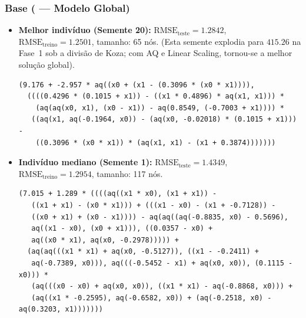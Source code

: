\subsubsection{Base  ( --- Modelo Global)}
\begin{itemize}
  \item \textbf{Melhor indivíduo (Semente 20):}
        $\text{RMSE}_{\text{teste}} = \mathbf{1.2842}$, $\text{RMSE}_{\text{treino}} = 1.2501$, tamanho: 65 nós.
        (Esta semente explodia para $415.26$ na Fase~1 sob a divisão de Koza;
        com AQ e Linear Scaling, tornou-se a melhor solução global).
\begin{lstlisting}
(9.176 + -2.957 * aq((x0 + (x1 - (0.3096 * (x0 * x1)))),
  ((((0.4296 * (0.1015 + x1)) - ((x1 * 0.4896) * aq(x1, x1))) *
    (aq(aq(x0, x1), (x0 - x1)) - aq(0.8549, (-0.7003 + x1)))) *
   ((aq(x1, aq(-0.1964, x0)) - (aq(x0, -0.02018) * (0.1015 + x1))) -
    ((0.3096 * (x0 * x1)) * (aq(x1, x1) - (x1 + 0.3874)))))))
\end{lstlisting}
  \item \textbf{Indivíduo mediano (Semente 1):}
        $\text{RMSE}_{\text{teste}} = 1.4349$, $\text{RMSE}_{\text{treino}} = 1.2954$, tamanho: 117 nós.
\begin{lstlisting}
(7.015 + 1.289 * ((((aq((x1 * x0), (x1 + x1)) -
   ((x1 + x1) - (x0 * x1))) + (((x1 - x0) - (x1 + -0.7128)) -
   ((x0 + x1) + (x0 - x1)))) - aq(aq((aq(-0.8835, x0) - 0.5696),
   aq((x1 - x0), (x0 + x1))), ((0.0357 - x0) +
   aq((x0 * x1), aq(x0, -0.2978))))) +
  (aq(aq(((x1 * x1) + aq(x0, -0.5127)), ((x1 - -0.2411) +
   aq(-0.7389, x0))), aq(((-0.5452 - x1) + aq(x0, x0)), (0.1115 - x0))) *
   (aq(((x0 - x0) + aq(x0, x0)), ((x1 * x1) - aq(-0.8868, x0))) +
   (aq((x1 * -0.2595), aq(-0.6582, x0)) + (aq(-0.2518, x0) - aq(0.3203, x1)))))))
\end{lstlisting}
\end{itemize}

